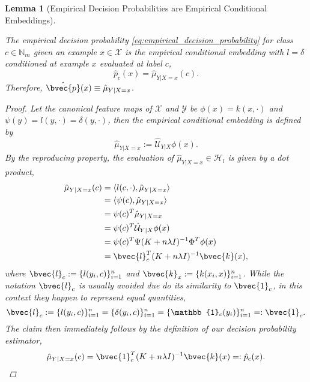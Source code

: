 \documentclass{article}
\newtheorem{lemma}[theorem]{Lemma}
\begin{document}
	\begin{lemma}[Empirical Decision Probabilities are Empirical Conditional Embeddings]
	\label{thm:empirical_probability_is_embedding}
	
		The empirical decision probability \eqref{eq:empirical_decision_probability} for class $c \in \mathbb{N}_{m}$ given an example $x \in \mathcal{X}$ is the empirical conditional embedding with $l = \delta$ conditioned at example $x$ evaluated at label $c$,
		\begin{equation}
			\hat{p}_{c}(x) = \hat{\mu}_{Y | X = x}(c).
		\end{equation}
		Therefore, $\hat{\bvec{p}}(x) \equiv \hat{\mu}_{Y | X = x}$.
				
		\begin{proof}
			
			Let the canonical feature maps of $\mathcal{X}$ and $\mathcal{Y}$ be $\phi(x) = k(x, \cdot)$ and $\psi(y) = l(y, \cdot) = \delta(y, \cdot)$, then the empirical conditional embedding is defined by
			\begin{equation}
				\hat{\mu}_{Y | X = x} := \hat{\mathcal{U}}_{Y | X} \phi(x).
			\end{equation}
			By the reproducing property, the evaluation of $\hat{\mu}_{Y | X = x} \in \mathcal{H}_{l}$ is given by a dot product,
			\begin{equation}
				\begin{aligned}
					\hat{\mu}_{Y | X = x}(c) &= \langle l(c, \cdot), \hat{\mu}_{Y | X = x} \rangle \\
					&= \langle \psi(c), \hat{\mu}_{Y | X = x} \rangle \\
					&= \psi(c)^{T} \hat{\mu}_{Y | X = x} \\
					&= \psi(c)^{T} \hat{\mathcal{U}}_{Y | X} \phi(x) \\
					&= \psi(c)^{T} \Psi (K + n \lambda I)^{-1} \Phi^{T} \phi(x) \\
					&= \bvec{l}_{c}^{T} (K + n \lambda I)^{-1} \bvec{k}(x), \\
				\end{aligned}
			\end{equation}
			where $\bvec{l}_{c} := \{l(y_{i}, c)\}_{i = 1}^{n}$ and $\bvec{k}_{x} := \{k(x_{i}, x)\}_{i = 1}^{n}$. While the notation $\bvec{l}_{c}$ is usually avoided due do its similarity to $\bvec{1}_{c}$, in this context they happen to represent equal quantities,
			\begin{equation}
				\bvec{l}_{c} := \{l(y_{i}, c)\}_{i = 1}^{n} = \{\delta(y_{i}, c)\}_{i = 1}^{n} = \{\mathbb{1}_{c}(y_{i})\}_{i = 1}^{n} =: \bvec{1}_{c}.
			\end{equation}
			The claim then immediately follows by the definition of our decision probability estimator,
			\begin{equation}
				\hat{\mu}_{Y | X = x}(c) = \bvec{1}_{c}^{T} (K + n \lambda I)^{-1} \bvec{k}(x) =: \hat{p}_{c}(x).
			\end{equation}
		\end{proof}
		
	\end{lemma}
	
\end{document}
